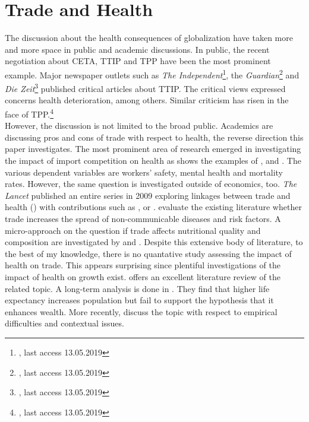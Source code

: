 \documentclass{article}
\begin{document}
\section{Trade and Health}
The discussion about the health consequences of globalization have taken more and more space in public and academic discussions. In public, the recent negotiation about CETA, TTIP and TPP have been the most prominent example. Major newspaper outlets such as \textit{The Independent}\footnote{\cite{independent}, last access 13.05.2019}, the \textit{ Guardian}\footnote{\cite{guardian}, last access 13.05.2019} and \textit{Die Zeit}\footnote{\cite{zeit}, last access 13.05.2019} published critical articles about TTIP. The critical views expressed concerns health deterioration, among others. Similar criticism has risen in the face of TPP.\footnote{\cite{vox}, last access 13.05.2019} \\
However, the discussion is not limited to the broad public. Academics are discussing pros and cons of trade with respect to health, the reverse direction this paper investigates. The most prominent area of research emerged in investigating the impact of import competition on health as shows the examples of \cite{lang2019effects}, \cite{colantone2015hidden} and \cite{mcmanus2016effects}. The various dependent variables are workers' safety, mental health and mortality rates. However, the same question is investigated outside of economics, too. \textit{The Lancet} published an entire series in 2009 exploring linkages between trade and health (\cite{smith2009trade_2}) with contributions such as \cite{stiglitz2009trade}, \cite{blouin2009trade} or \cite{smith2009trade}. \cite{cowling2018analyzing} evaluate the existing literature whether trade increases the spread of non-communicable diseases and risk factors. 
A micro-approach on the question if trade affects nutritional quality and composition are investigated by \cite{lopez2017trade} and \cite{wood2018trade}. Despite this extensive body of literature, to the best of my knowledge, there is no quantative study assessing the impact of health on trade. This appears surprising since plentiful investigations of the impact of health on growth exist. \cite{weil2014health} offers an excellent literature review of the related topic. A long-term analysis is done in \cite{acemoglu2007disease}. They find that higher life expectancy increases population but fail to support the hypothesis that it enhances wealth. More recently, \cite{bloom2018health} discuss the topic with respect to empirical difficulties and contextual issues.
\end{document}
